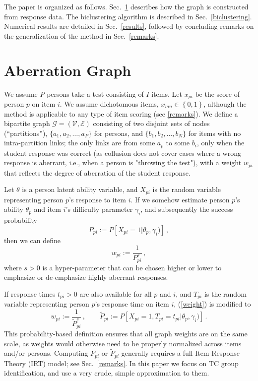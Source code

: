 \documentclass{article}
\newcommand{\cE}{\mathcal{E}}
\newcommand{\cG}{\mathcal{G}}
\newcommand{\cV}{\mathcal{V}}
\begin{document}
The paper is organized as follows. Sec.~\ref{model} describes how the graph is constructed from response data. The biclustering algorithm is described in Sec.~\ref{biclustering}. Numerical results are detailed in Sec.~\ref{results}, followed by concluding remarks on the generalization of the method in Sec.~\ref{remarks}.

\section{Aberration Graph}
\label{model}
We assume $P$ persons take a test consisting of $I$ items. Let $x_{pi}$ be the score of person $p$ on item $i$. We assume dichotomous items, $x_{mn} \in \left\{0,1\right\}$, although the method is applicable to any type of item scoring (see \ref{remarks}). We define a bipartite graph $\cG = (\cV, \cE)$ consisting of two disjoint sets of nodes (``partitions''), $\{a_1,a_2,\ldots,a_P\}$ for persons, and $\{b_1,b_2,\ldots,b_N\}$ for items with no intra-partition links; the only links are from some $a_p$ to some $b_i$, only when the student response was correct (as collusion does not cover cases where a wrong response is aberrant, i.e., when a person is "throwing the test"), with a weight $w_{pi}$ that reflects the degree of aberration of the student response.

Let $\theta$ is a person latent ability variable, and $X_{pi}$ is the random variable representing person $p$'s response to item $i$. If we somehow estimate person $p$'s ability $\theta_p$ and item $i$'s difficulty parameter $\gamma_i$, and subsequently the success probability
\begin{equation}
	P_{pi} := P \left [X_{pi}=1 | \theta_p, \gamma_i) \right]\,,
	\label{ppi} 
\end{equation}
then we can define
\begin{equation}
  w_{pi} := \frac{1}{P_{pi}^s} \,,
  \label{weight}
\end{equation}
where $s  > 0$ is a hyper-parameter that can be chosen higher or lower to emphasize or de-emphasize highly aberrant responses.

If response times $t_{pi} > 0$ are also available for all $p$ and $i$, and $T_{pi}$ is the random variable representing person $p$'s response time on item $i$, (\ref{weight}) is modified to
\begin{equation}
  w_{pi} := \frac{1}{\tilde{P}_{pi}^{s}}\,,\qquad \tilde{P}_{pi} := P \left[X_{pi}=1, T_{pi}=t_{pi} | \theta_p, \gamma_i) \right]\,.
\end{equation}
This probability-based definition ensures that all graph weights are on the same scale, as weights would otherwise need to be properly normalized across items and/or persons. Computing $P_{pi}$ or $\tilde{P}_{pi}$ generally requires a full Item Response Theory (IRT) model; see Sec.~\ref{remarks}. In this paper we focus on TC group identification, and use a very crude, simple approximation to them.
\end{document}
